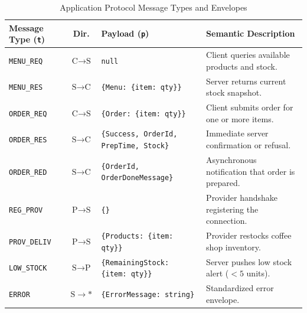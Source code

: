 \documentclass[12pt,a4paper]{article}
\begin{document}
\begin{table}[htbp]
\centering
\caption{Application Protocol Message Types and Envelopes}
\label{tab:protocol_messages}
\small
\begin{tabularx}{\textwidth}{l c l X}
\toprule
\textbf{Message Type (\texttt{t})} & \textbf{Dir.} & \textbf{Payload (\texttt{p})} & \textbf{Semantic Description} \\
\midrule
\texttt{MENU\_REQ} & $\text{C}\to\text{S}$ & \texttt{null} & Client queries available products and stock. \\
\texttt{MENU\_RES} & $\text{S}\to\text{C}$ & \texttt{\{Menu: \{item: qty\}\}} & Server returns current stock snapshot. \\
\texttt{ORDER\_REQ} & $\text{C}\to\text{S}$ & \texttt{\{Order: \{item: qty\}\}} & Client submits order for one or more items. \\
\texttt{ORDER\_RES} & $\text{S}\to\text{C}$ & \texttt{\{Success, OrderId, PrepTime, Stock\}} & Immediate server confirmation or refusal. \\
\texttt{ORDER\_RED} & $\text{S}\to\text{C}$ & \texttt{\{OrderId, OrderDoneMessage\}} & Asynchronous notification that order is prepared. \\
\texttt{REG\_PROV}  & $\text{P}\to\text{S}$ & \texttt{\{\}} & Provider handshake registering the connection. \\
\texttt{PROV\_DELIV}& $\text{P}\to\text{S}$ & \texttt{\{Products: \{item: qty\}\}} & Provider restocks coffee shop inventory. \\
\texttt{LOW\_STOCK} & $\text{S}\to\text{P}$ & \texttt{\{RemainingStock: \{item: qty\}\}} & Server pushes low stock alert ($<5$ units). \\
\texttt{ERROR}      & $\text{S}\to*$ & \texttt{\{ErrorMessage: string\}} & Standardized error envelope. \\
\bottomrule
\end{tabularx}
\end{table}
\end{document}
